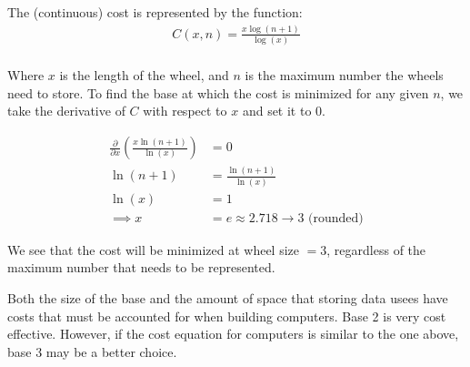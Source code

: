 \documentclass{article}
\begin{document}
\begin{enumerate}
	      The (continuous) cost is represented by the function: \\

	      \begin{align*}
		      C(x, n) = \frac{x \log(n + 1)}{\log(x)} \\
	      \end{align*}

	      Where $x$ is the length of the wheel, and $n$ is the maximum number the wheels need to store.
	      To find the base at which the cost is minimized for any given $n$, we take the
	      derivative of $C$ with respect to $x$ and set it to $0$.

	      \begin{align*}
		      \frac{ \partial }{\partial x} \left( \frac{x \ln(n+1)}{\ln(x)} \right)  & = 0                                       \\
		      \ln(n+1)                                                                & = \frac{\ln(n+1)}{\ln(x)}                 \\
		      \ln(x)                                                                  & = 1                                       \\
		      \implies                                                              x & = e \approx 2.718 \to 3 \text{ (rounded)}
	      \end{align*}

	      We see that the cost will be minimized at wheel size $ = 3$,
	      regardless of the maximum number that needs to be represented.

	      Both the size of the base and the amount of space that storing data usees
	      have costs that must be accounted for when building computers. Base 2 is
	      very cost effective. However, if the cost equation for computers is similar to
	      the one above, base 3 may be a better choice. \\




\end{enumerate}
\end{document}
